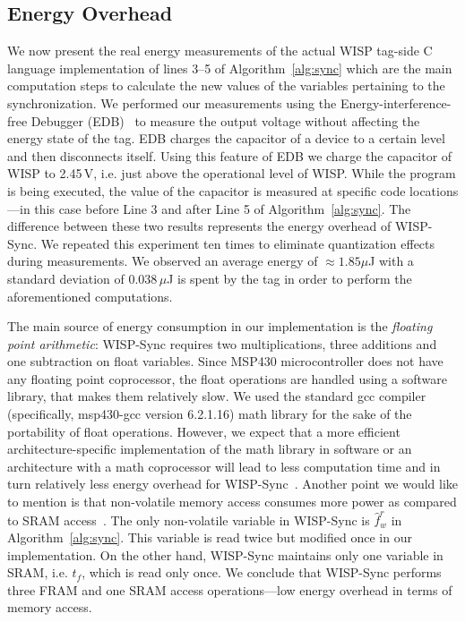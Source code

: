 \documentclass[10pt,journal,compsoc]{IEEEtran}
\begin{document}
\subsection{Energy Overhead}
%
We now present the real energy measurements of the actual WISP tag-side C language implementation of lines 3--5 of Algorithm~\ref{alg:sync} which are the main computation steps to calculate the new values of the variables pertaining to the synchronization. We performed our measurements using the Energy-interference-free Debugger (EDB)~\cite{colin2016energy} to measure the output voltage without affecting the energy state of the tag. EDB charges the capacitor of a device to a certain level and then disconnects itself. Using this feature of EDB we charge the capacitor of WISP to 2.45\,V, i.e. just above the operational level of WISP. While the program is being executed, the value of the capacitor is measured at specific code locations---in this case before Line 3 and after Line 5 of Algorithm~\ref{alg:sync}. The difference between these two results represents the energy overhead of WISP-Sync. We repeated this experiment ten times to eliminate quantization effects during measurements. We observed an average energy of $\approx1.85 \mu$J with a standard deviation of 0.038\,$\mu$J is spent by the tag in order to perform the aforementioned computations.

The main source of energy consumption in our implementation is the \emph{floating point arithmetic}: WISP-Sync requires two multiplications, three additions and one subtraction on float variables. Since MSP430 microcontroller does not have any floating point coprocessor, the float operations are handled using a software library, that makes them relatively slow. We used the standard gcc compiler (specifically, msp430-gcc version 6.2.1.16) math library for the sake of the portability of float operations. However, we expect that a more efficient architecture-specific implementation of the math library in software or an architecture with a math coprocessor will lead to less computation time and in turn relatively less energy overhead for WISP-Sync~\cite{mathlib_website}. Another point we would like to mention is that non-volatile memory access consumes more power as compared to SRAM access~\cite[Section 3.3]{ti_fram}. The only non-volatile variable in WISP-Sync is $\hat{f}_w^r$ in Algorithm~\ref{alg:sync}. This variable is read twice but modified once in our implementation. On the other hand, WISP-Sync maintains only one variable in SRAM, i.e. $t_f$, which is read only once. We conclude that WISP-Sync performs three FRAM and one SRAM access operations---low energy overhead in terms of memory access.
\end{document}
